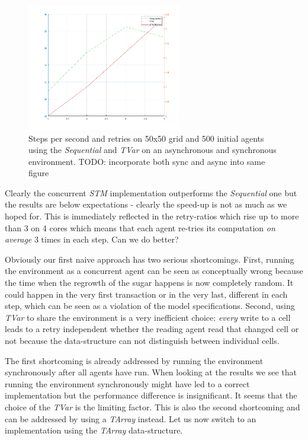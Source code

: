 \begin{figure}
	\centering
	\includegraphics[width=0.6\textwidth, angle=0]{./fig/sugarscape/tvar_concenv_500_50x50.png}
	\caption{Steps per second and retries on 50x50 grid and 500 initial agents using the \textit{Sequential} and \textit{TVar} on an asynchronous and synchronous environment. TODO: incorporate both sync and async into same figure}
	\label{fig:naive_results_time}
\end{figure}

Clearly the concurrent \textit{STM} implementation outperforms the \textit{Sequential} one but the results are below expectations - clearly the speed-up is not as much as we hoped for. This is immediately reflected in the retry-ratios which rise up to more than 3 on 4 cores which means that each agent re-tries its computation \textit{on average} 3 times in each step. Can we do better?

Obviously our first naive approach has two serious shortcomings. First, running the environment as a concurrent agent can be seen as conceptually wrong because the time when the regrowth of the sugar happens is now completely random. It could happen in the very first transaction or in the very last, different in each step, which can be seen as a violation of the model specifications. Second, using \textit{TVar} to share the environment is a very inefficient choice: \textit{every} write to a cell leads to a retry independent whether the reading agent read that changed cell or not because the data-structure can not distinguish between individual cells.

The first shortcoming is already addressed by running the environment synchronously after all agents have run. When looking at the results we see that running the environment synchronously might have led to a correct implementation but the performance difference is insignificant. It seems that the choice of the \textit{TVar} is the limiting factor. This is also the second shortcoming and can be addressed by using a \textit{TArray} instead. Let us now switch to an implementation using the \textit{TArray} data-structure.

